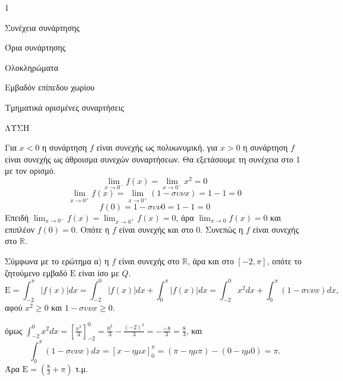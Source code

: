 \begin{ylh}{1}
    \item Συνέχεια συνάρτησης
    \item Όρια συνάρτησης
    \item Ολοκληρώματα
    \item Εμβαδόν επίπεδου χωρίου
    \item Τμηματικά ορισμένες συναρτήσεις
\end{ylh}

ΛΥΣΗ
\begin{alist}
\item Για $x < 0$ η συνάρτηση $f$ είναι συνεχής ως πολυωνυμική, για $x > 0$ η συνάρτηση $f$ είναι συνεχής ως άθροισμα συνεχών συναρτήσεων. Θα εξετάσουμε τη συνέχεια στο 1 με τον ορισμό.
\[
    \lim_{x \to 0^-} f(x) = \lim_{x \to 0^-} x^2 = 0
\]
\[
    \lim_{x \to 0^+} f(x) = \lim_{x \to 0^+} (1 - \sigma\upsilon\nu x) = 1 - 1 = 0
\]
\[
    f(0) = 1 - \sigma\upsilon\nu 0 = 1 - 1 = 0
\]
Επειδή $\lim_{x \to 0^-} f(x) = \lim_{x \to 0^+} f(x) = 0$, άρα $\lim_{x \to 0} f(x) = 0$ και επιπλέον $f(0) = 0$. Οπότε η $f$ είναι συνεχής και στο 0.
Συνεπώς η $f$ είναι συνεχής στο $\mathbb{R}$.

\item Σύμφωνα με το ερώτημα α) η $f$ είναι συνεχής στο $\mathbb{R}$, άρα και στο $[-2 , \pi]$, οπότε το ζητούμενο εμβαδό $\mathrm{E}$ είναι ίσο με $Q$.
\[
    \mathrm{E} = \int_{-2}^{\pi} |f(x)|dx = \int_{-2}^{0} |f(x)|dx + \int_{0}^{\pi} |f(x)|dx = \int_{-2}^{0} x^2 dx + \int_{0}^{\pi} (1 - \sigma\upsilon\nu x)dx,
\]
αφού $x^2 \ge 0$ και $1 - \sigma\upsilon\nu x \ge 0$.

όμως $\int_{-2}^{0} x^2 dx = \left[\frac{x^3}{3}\right]_{-2}^{0} = \frac{0^3}{3} - \frac{(-2)^3}{3} = - \frac{-8}{3} = \frac{8}{3}$, και
\[
    \int_{0}^{\pi} (1 - \sigma\upsilon\nu x)dx = [x - \eta\mu x]_{0}^{\pi} = (\pi - \eta\mu\pi) - (0 - \eta\mu 0) = \pi.
\]
Άρα $\mathrm{E} = \left(\frac{8}{3} + \pi\right)$ τ.μ.
\end{alist}